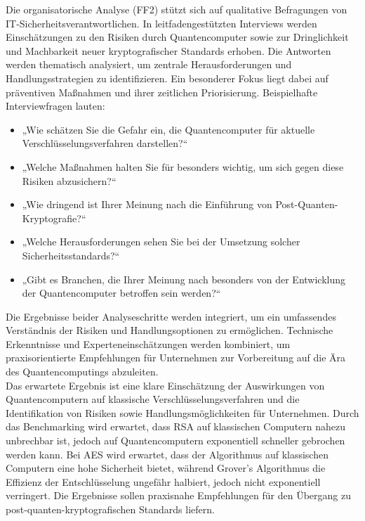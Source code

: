 Die organisatorische Analyse (FF2) stützt sich auf qualitative Befragungen von IT-Sicherheitsverantwortlichen. 
In leitfadengestützten Interviews werden Einschätzungen zu den Risiken durch Quantencomputer 
sowie zur Dringlichkeit und Machbarkeit neuer kryptografischer Standards erhoben. Die Antworten werden thematisch 
analysiert, um zentrale Herausforderungen und Handlungsstrategien zu identifizieren. Ein besonderer Fokus liegt dabei 
auf präventiven Maßnahmen und ihrer zeitlichen Priorisierung. Beispielhafte Interviewfragen lauten:

\begin{itemize}
    \item „Wie schätzen Sie die Gefahr ein, die Quantencomputer für aktuelle Verschlüsselungsverfahren darstellen?“
    \item „Welche Maßnahmen halten Sie für besonders wichtig, um sich gegen diese Risiken abzusichern?“
    \item „Wie dringend ist Ihrer Meinung nach die Einführung von Post-Quanten-Kryptografie?“
    \item „Welche Herausforderungen sehen Sie bei der Umsetzung solcher Sicherheitsstandards?“
    \item „Gibt es Branchen, die Ihrer Meinung nach besonders von der Entwicklung der Quantencomputer betroffen sein werden?“
\end{itemize}

Die Ergebnisse beider Analyseschritte werden integriert, um ein umfassendes Verständnis der Risiken und 
Handlungsoptionen zu ermöglichen. Technische Erkenntnisse und Experteneinschätzungen werden kombiniert, um 
praxisorientierte Empfehlungen für Unternehmen zur Vorbereitung auf die Ära des Quantencomputings abzuleiten.\\

Das erwartete Ergebnis ist eine klare Einschätzung der Auswirkungen von Quantencomputern 
auf klassische Verschlüsselungsverfahren und die Identifikation von Risiken sowie 
Handlungsmöglichkeiten für Unternehmen. Durch das Benchmarking wird erwartet, dass RSA auf klassischen Computern nahezu 
unbrechbar ist, jedoch auf Quantencomputern exponentiell schneller gebrochen werden kann. 
Bei AES wird erwartet, dass der Algorithmus auf klassischen Computern 
eine hohe Sicherheit bietet, während Grover's Algorithmus die Effizienz 
der Entschlüsselung ungefähr halbiert, jedoch nicht exponentiell verringert.
Die Ergebnisse sollen praxisnahe Empfehlungen 
für den Übergang zu post-quanten-kryptografischen Standards liefern.
